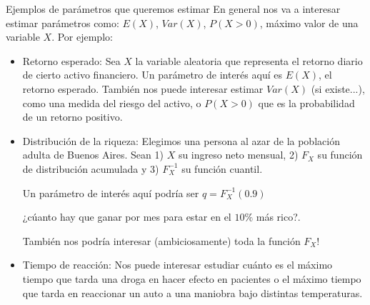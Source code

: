 \documentclass{beamer}
\theoremstyle{definition}
\begin{document}
\begin{frame}{\color{rosee}Ejemplos de parámetros que queremos estimar}
\small
En general nos va a interesar estimar parámetros como: 
    $E(X)$, $Var(X)$, $P(X>0)$, m\'aximo valor de una variable $X$. Por ejemplo:
 \begin{itemize}
 \item \color{gren}Retorno esperado: \color{black}
    Sea $X$ la variable aleatoria que representa el retorno diario de cierto activo financiero. Un par\'ametro de inter\'es aqu\'i es $E(X)$, el retorno esperado. Tambi\'en nos puede interesar estimar
    $Var(X)$ (si existe...), como una medida del riesgo del activo, o $P(X>0)$ que es la probabilidad de un retorno positivo.
     \item\color{gren} Distribuci\'on de la riqueza: \color{black}
    Elegimos una persona al azar de la poblaci\'on adulta de Buenos
    Aires. Sean 1) $X$ su ingreso neto mensual, 2) $F_{X}$ su funci\'on de distribuci\'on acumulada y
    3) $F^{-1}_{X}$ su funci\'on cuantil.

    Un par\'ametro de inter\'es aqu\'i podría ser $q=F^{-1}_{X}(0.9)$
    
    ¿c\'uanto hay que ganar por mes para estar en el $10\%$ m\'as rico?.
    
    \medskip
    También nos podr\'ia interesar (ambiciosamente) toda la funci\'on $F_{X}$!
     \item\color{gren} Tiempo de reacción: \color{black} Nos puede interesar estudiar cuánto es el máximo tiempo que tarda una droga en hacer efecto en pacientes o el máximo tiempo que tarda en reaccionar un auto a una maniobra bajo distintas temperaturas.
  \end{itemize}
  
\end{frame}
\end{document}

